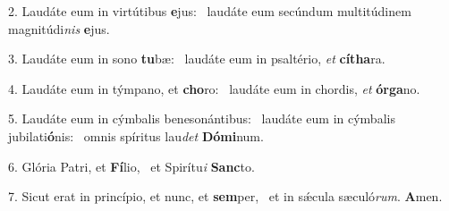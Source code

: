 2. Laudáte eum in virtútibus \textbf{e}jus: \ast\  laudáte eum secúndum multitúdinem magnitúdi\textit{nis} \textbf{e}jus.\

3. Laudáte eum in sono \textbf{tu}bæ: \ast\  laudáte eum in psaltério, \textit{et} \textbf{cí}\textbf{tha}ra.\

4. Laudáte eum in týmpano, et \textbf{cho}ro: \ast\  laudáte eum in chordis, \textit{et} \textbf{ór}\textbf{ga}no.\

5. Laudáte eum in cýmbalis benesonántibus: \dag\  laudáte eum in cýmbalis jubilati\textbf{ó}nis: \ast\  omnis spíritus lau\textit{det} \textbf{Dó}\textbf{mi}num.\

6. Glória Patri, et \textbf{Fí}lio, \ast\  et Spirítu\textit{i} \textbf{Sanc}to.\

7. Sicut erat in princípio, et nunc, et \textbf{sem}per, \ast\  et in sǽcula sæculó\textit{rum}. \textbf{A}men.\

